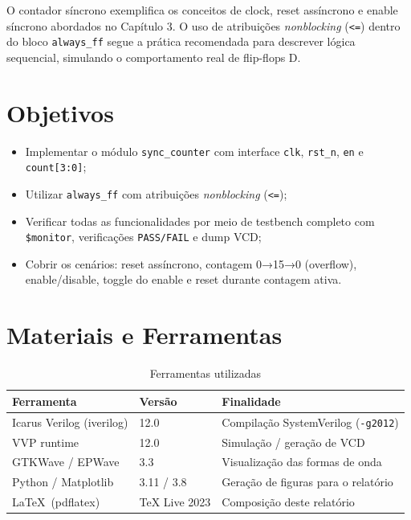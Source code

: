 \documentclass[12pt,a4paper]{article}
\begin{document}
\begin{unidadebox}
  O contador síncrono exemplifica os conceitos de clock, reset assíncrono e enable
  síncrono abordados no Capítulo 3. O uso de atribuições \textit{nonblocking} (\texttt{<=})
  dentro do bloco \texttt{always\_ff} segue a prática recomendada para descrever
  lógica sequencial, simulando o comportamento real de flip-flops D.
\end{unidadebox}

\section{Objetivos}

\begin{itemize}[leftmargin=1.5cm]
  \item Implementar o módulo \texttt{sync\_counter} com interface
        \texttt{clk}, \texttt{rst\_n}, \texttt{en} e \texttt{count[3:0]};
  \item Utilizar \texttt{always\_ff} com atribuições \textit{nonblocking} (\texttt{<=});
  \item Verificar todas as funcionalidades por meio de testbench completo com
        \texttt{\$monitor}, verificações \texttt{PASS/FAIL} e dump VCD;
  \item Cobrir os cenários: reset assíncrono, contagem 0→15→0 (overflow),
        enable/disable, toggle do enable e reset durante contagem ativa.
\end{itemize}

\section{Materiais e Ferramentas}

\begin{table}[H]
  \centering
  \caption{Ferramentas utilizadas}
  \label{tab:ferramentas}
  \begin{tabular}{lll}
    \toprule
    \textbf{Ferramenta} & \textbf{Versão} & \textbf{Finalidade} \\
    \midrule
    Icarus Verilog (iverilog) & 12.0 & Compilação SystemVerilog (\texttt{-g2012}) \\
    VVP runtime               & 12.0 & Simulação / geração de VCD \\
    GTKWave / EPWave          & 3.3  & Visualização das formas de onda \\
    Python / Matplotlib       & 3.11 / 3.8 & Geração de figuras para o relatório \\
    \LaTeX\ (pdflatex)        & TeX Live 2023 & Composição deste relatório \\
    \bottomrule
  \end{tabular}
\end{table}
\end{document}

